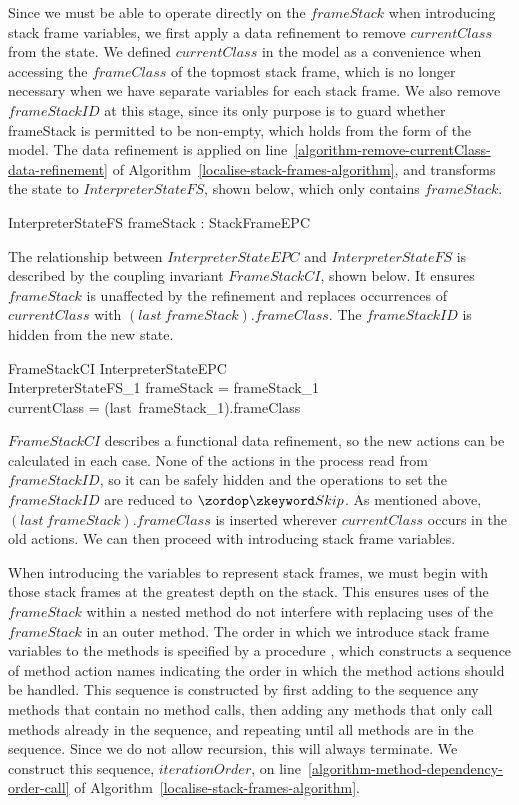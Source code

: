 Since we must be able to operate directly on the $frameStack$ when
introducing stack frame variables, we first apply a data refinement to
remove $currentClass$ from the state.
We defined $currentClass$ in the model as a convenience when accessing
the $frameClass$ of the topmost stack frame, which is no longer
necessary when we have separate variables for each stack frame.
We also remove $frameStackID$ at this stage, since its only purpose is
to guard whether frameStack is permitted to be non-empty, which holds
from the form of the model.
The data refinement is applied on
line~\ref{algorithm-remove-currentClass-data-refinement} of
Algorithm~\ref{localise-stack-frames-algorithm}, and transforms the
state to $InterpreterStateFS$, shown below, which only contains
$frameStack$.
\begin{schema}{InterpreterStateFS}
  frameStack : StackFrameEPC
\end{schema}

The relationship between $InterpreterStateEPC$ and
$InterpreterStateFS$ is described by the coupling invariant
$FrameStackCI$, shown below.
It ensures $frameStack$ is unaffected by the refinement and replaces
occurrences of $currentClass$ with $(last~frameStack).frameClass$.
The $frameStackID$ is hidden from the new state.
\begin{schema}{FrameStackCI}
  InterpreterStateEPC \\
  InterpreterStateFS_1
\where
  frameStack = frameStack_1 \\
  currentClass = (last~frameStack_1).frameClass
\end{schema}

$FrameStackCI$ describes a functional data refinement, so the new
actions can be calculated in each case.
None of the actions in the process read from $frameStackID$, so it can
be safely hidden and the operations to set the $frameStackID$ are
reduced to $\Skip$.
As mentioned above, $(last~frameStack).frameClass$ is inserted
wherever $currentClass$ occurs in the old actions.
We can then proceed with introducing stack frame variables.

When introducing the variables to represent stack frames, we must
begin with those stack frames at the greatest depth on the stack.
This ensures uses of the $frameStack$ within a nested method do not
interfere with replacing uses of the $frameStack$ in an outer method.
The order in which we introduce stack frame variables to the methods
is specified by a procedure , which
constructs a sequence of method action names indicating the order in
which the method actions should be handled.
This sequence is constructed by first adding to the sequence any
methods that contain no method calls, then adding any methods that
only call methods already in the sequence, and repeating until all
methods are in the sequence.
Since we do not allow recursion, this will always terminate.
We construct this sequence, $iterationOrder$, on
line~\ref{algorithm-method-dependency-order-call} of
Algorithm~\ref{localise-stack-frames-algorithm}.


